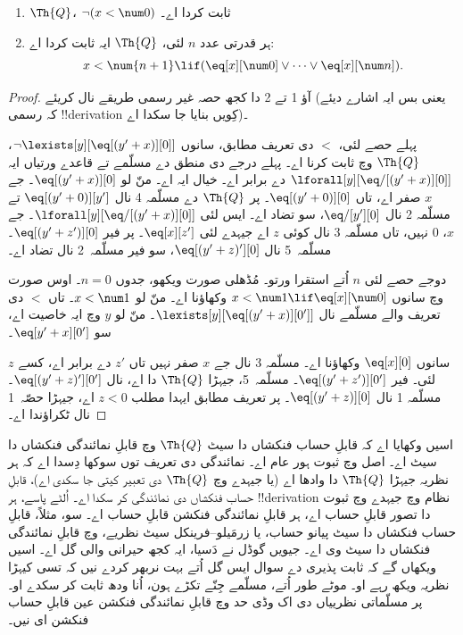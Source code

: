 \documentclass[../../../include/open-logic-section]{subfiles}
\begin{document}
\begin{lem}
\begin{enumerate}
\item $\Th{Q}$، $\lnot (x < \num 0)$ ثابت کردا اے۔
\item ہر قدرتی عدد $n$ لئی، $\Th{Q}$ ایہ ثابت کردا اے:
\[
x < \num {n+1} \lif (\eq[x][\num 0] \lor \dots \lor \eq[x][\num n]).
\]
\end{enumerate}
\end{lem}

\begin{proof}
آؤ 1 تے 2 دا کجھ حصہ غیر رسمی طریقے نال کریئے (یعنی بس ایہ اشارے دیئے کہ رسمی !!{derivation} کِویں بنایا جا سکدا اے)۔

پہلے حصے لئی، $<$ دی تعریف مطابق، سانوں $\lnot
\lexists[y][\eq[(y'+x)][0]]$، $\Th{Q}$ وچ ثابت کرنا اے۔ پہلے درجے دی منطق دے مسلّمے تے قاعدے ورتیاں ایہ $\lforall[y][\eq/[(y' +
    x)][0]]$ دے برابر اے۔ خیال ایہ اے۔ منّ لو $\eq[(y'+x)][0]$۔ جے $x$ صفر اے، تاں $\eq[(y' + 0)][0]$۔ پر $\Th{Q}$ دے مسلّمہ 4 نال
$\eq[(y' + 0)][y']$ تے مسلّمہ 2 نال $\eq/[y'][0]$، سو تضاد اے۔ ایس لئی
$\lforall[y][\eq/[(y' +x)][0]]$۔ جے $x$، $0$ نہیں، تاں مسلّمہ 3 نال کوئی $z$ اے جیہدے لئی $\eq[x][z']$۔ پر فیر
$\eq[(y' + z')][0]$۔ مسلّمہ~5 نال $\eq[(y' + z)'][0]$، سو فیر مسلّمہ~2 نال تضاد اے۔

دوجے حصے لئی $n$ اُتے استقرا ورتو۔ مُڈھلی صورت ویکھو، جدوں $n =0$۔ اوس صورت وچ سانوں $x < \num 1 \lif \eq[x][\num
  0]$ وکھاؤنا اے۔ منّ لو $x < \num 1$۔ تاں $<$ دی تعریف والے مسلّمے نال $\lexists[y][\eq[(y'+x)][0']]$۔ منّ لو $y$ وچ ایہ خاصیت اے، سو $\eq[y'+x][0']$۔

سانوں $\eq[x][0]$ وکھاؤنا اے۔ مسلّمہ 3 نال جے $x$ صفر نہیں تاں $z'$ دے برابر اے، کسے $z$ لئی۔ فیر $\eq[(y' + z')][0']$۔ مسلّمہ~5، جیہڑا
$\Th{Q}$ دا اے، نال $\eq[(y'+z)'][0']$۔ مسلّمہ 1 نال $\eq[(y' +
    z)][0]$۔ پر تعریف مطابق ایہدا مطلب $z < 0$ اے، جیہڑا حصّہ~1 نال ٹکراؤندا اے۔
\end{proof}

\begin{explain}
اسیں وکھایا اے کہ قابلِ حساب فنکشاں دا سیٹ $\Th{Q}$ وچ قابلِ نمائندگی فنکشاں دا سیٹ اے۔ اصل وچ ثبوت ہور عام اے۔ نمائندگی دی تعریف توں سوکھا دِسدا اے کہ ہر نظریہ جیہڑا $\Th{Q}$ دا وادھا اے (یا جیہدے وچ $\Th{Q}$ دی تعبیر کیتی جا سکدی اے)، قابلِ حساب فنکشاں دی نمائندگی کر سکدا اے۔ اُلٹے پاسے، ہر !!{derivation} نظام وچ جیہدے وچ ثبوت دا تصور قابلِ حساب اے، ہر قابلِ نمائندگی فنکشن قابلِ حساب اے۔ سو، مثلاً، قابلِ حساب فنکشاں دا سیٹ پیانو حساب، یا زرمَیلو–فرینکل سیٹ نظریے، وچ قابلِ نمائندگی فنکشاں دا سیٹ وی اے۔ جیویں گوڈل نے دَسیا، ایہ کجھ حیرانی والی گل اے۔ اسیں ویکھاں گے کہ ثابت پذیری دے سوال ایس گل اُتے بہت نربھر کردے نیں کہ تسی کیہڑا نظریہ ویکھ رہے او۔ موٹے طور اُتے، مسلّمے جِنّے تکڑے ہون، اُنا ودھ ثابت کر سکدے او۔ پر مسلّماتی نظرییاں دی اک وڈی حد وچ قابلِ نمائندگی فنکشن عین قابلِ حساب فنکشن ای نیں۔
\end{explain}
\end{document}
